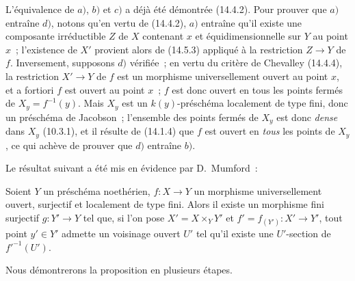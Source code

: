 L'équivalence de $a)$, $b)$ et $c)$ a déjà été démontrée (14.4.2). Pour prouver
que $a)$ entraîne $d)$, notons qu'en vertu de (14.4.2), $a)$ entraîne qu'il existe
une composante irréductible $Z$ de $X$ contenant $x$ et équidimensionnelle sur $Y$
au point $x$~; l'existence de $X'$ provient alors de (14.5.3) appliqué à la
restriction $Z\to Y$ de $f$. Inversement, supposons $d)$ vérifiée~; en vertu du
critère de Chevalley (14.4.4), la restriction $X'\to Y$ de $f$ est un morphisme
universellement ouvert au point $x$, et a fortiori $f$ est ouvert au point $x$~;
$f$ est donc ouvert en tous les points fermés de $X_y=f^{-1}(y)$. Mais $X_y$ est
un $k(y)$-préschéma localement de type fini, donc un préschéma de Jacobson~;
l'ensemble des points fermés de $X_y$ est donc \emph{dense} dans $X_y$ (10.3.1),
et il résulte de (14.1.4) que $f$ est ouvert en \emph{tous} les points de $X_y$, ce
qui achève de prouver que $d)$ entraîne $b)$.

Le résultat suivant a été mis en évidence par D.~Mumford~:

\begin{proposition}[14.5.10]
\label{IV.14.5.10-fr}
Soient $Y$ un préschéma noethérien, $f:X\to Y$ un morphisme universellement ouvert,
surjectif et localement de type fini. Alors il existe un morphisme fini surjectif
$g:Y'\to Y$ tel que, si l'on pose $X'=X\times_Y Y'$ et
$f'=f_{(Y')}:X'\to Y'$, tout point $y'\in Y'$ admette un voisinage ouvert $U'$ tel
qu'il existe une $U'$-section de $f'^{-1}(U')$.
\end{proposition}

Nous démontrerons la proposition en plusieurs étapes.

